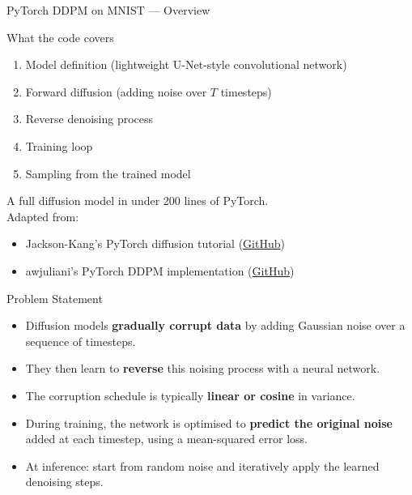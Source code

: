 \documentclass[aspectratio=169,10pt]{beamer}
\begin{document}
\begin{frame}{PyTorch DDPM on MNIST — Overview}
  \begin{block}{What the code covers}
    \begin{enumerate}
      \item Model definition (lightweight U-Net-style convolutional network)
      \item Forward diffusion (adding noise over $T$ timesteps)
      \item Reverse denoising process
      \item Training loop
      \item Sampling from the trained model
    \end{enumerate}
  \end{block}
  A full diffusion model in under 200 lines of PyTorch.\\[4pt]
  Adapted from:
  \begin{itemize}
    \item Jackson-Kang's PyTorch diffusion tutorial
          (\href{https://github.com/Jackson-Kang/Pytorch-Diffusion-Model-Tutorial}{GitHub})
    \item awjuliani's PyTorch DDPM implementation
          (\href{https://github.com/awjuliani/pytorch-diffusion}{GitHub})
  \end{itemize}
\end{frame}

\begin{frame}{Problem Statement}
  \begin{itemize}
    \item Diffusion models \textbf{gradually corrupt data} by adding
          Gaussian noise over a sequence of timesteps.
    \item They then learn to \textbf{reverse} this noising process with a
          neural network.
    \item The corruption schedule is typically \textbf{linear or cosine}
          in variance.
    \item During training, the network is optimised to
          \textbf{predict the original noise} added at each timestep,
          using a mean-squared error loss.
    \item At inference: start from random noise and iteratively apply
          the learned denoising steps.
  \end{itemize}
\end{frame}
\end{document}
